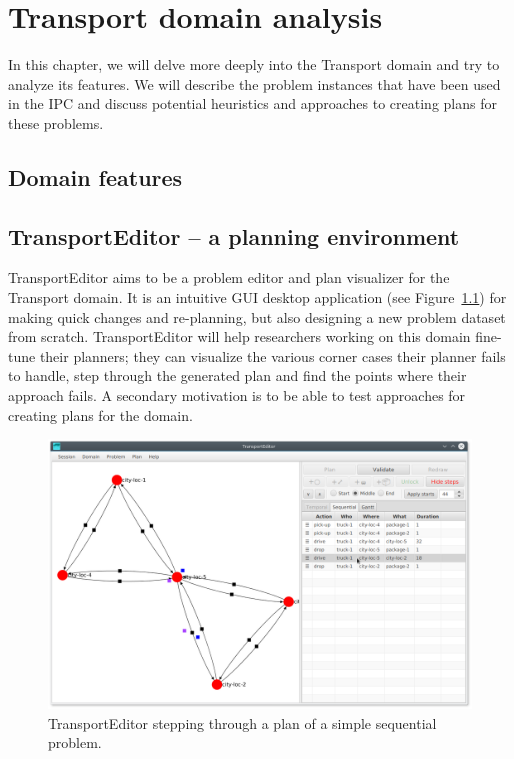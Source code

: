 \chapter{Transport domain analysis}

In this chapter, we will delve more deeply into the Transport domain and try to analyze its features.
We will describe the problem instances that have been used in the IPC and discuss potential
heuristics and approaches to creating plans for these problems.

\section{Domain features}




\section{TransportEditor -- a planning environment}

TransportEditor aims to be a problem editor and plan visualizer for the Transport domain.
It is an intuitive GUI desktop application (see Figure~\ref{fig:transporteditor-screenshot}) for making quick changes and re-planning, but also designing a new problem dataset from scratch. TransportEditor will help researchers working on this domain fine-tune their planners; they can visualize the various corner cases their planner fails to handle, step through the generated plan and find the points where their approach fails.
A secondary motivation is to be able to test approaches for creating plans for the domain.

\begin{figure}[htb]
\begin{center}
\includegraphics[width=1.0\textwidth]{../img/transporteditor_screenshot}
\end{center}
\caption{TransportEditor stepping through a plan of a simple sequential problem.}
\label{fig:transporteditor-screenshot}
\end{figure}

